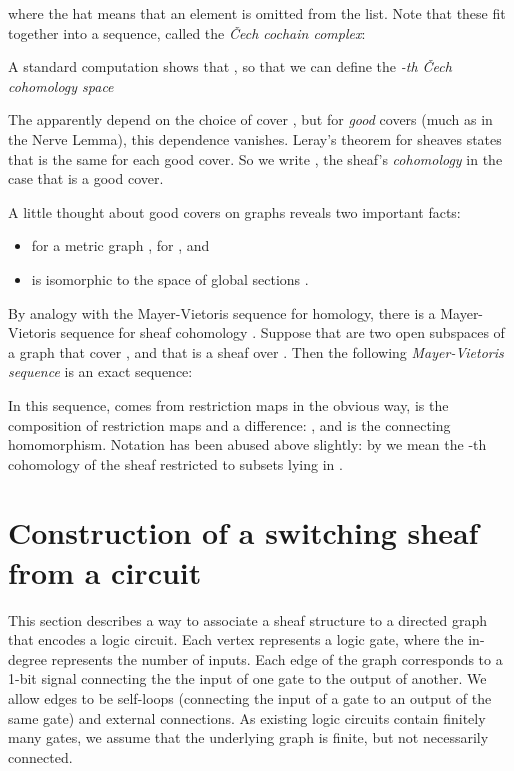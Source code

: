 \documentclass{amsart}
\theoremstyle{plain}
\theoremstyle{definition}
\begin{document}
where the hat means that an element is omitted from the list.
Note that these fit together into a sequence, called the {\it \v{C}ech
cochain complex}: 

A standard computation shows that , so that we can define
the {\it -th \v{C}ech cohomology space}


The  apparently depend on the choice of cover
, but for {\it good} covers (much as in the Nerve Lemma),
this dependence vanishes. Leray's theorem for sheaves states that
 is the same for each good
cover.  So we write
, the sheaf's
{\it cohomology} in the case that  is a good cover.

A little thought about good covers on graphs reveals two important facts:
\begin{itemize}
\item for a metric graph ,  for , and 
\item  is isomorphic to the space of global sections .  
\end{itemize}

By analogy with the Mayer-Vietoris sequence for homology, there is a
Mayer-Vietoris sequence for sheaf cohomology \cite{Bredon}.  Suppose
that  are two open subspaces of a graph  that cover , and
that  is a sheaf over .  Then the following {\it Mayer-Vietoris
  sequence} is an exact sequence:

In this sequence,  comes from restriction maps in the obvious way,
 is the composition of restriction maps and a difference: , and  is the
connecting homomorphism.  Notation has been abused above
slightly: by  we mean the -th cohomology of the sheaf 
restricted to subsets lying in .

\section{Construction of a switching sheaf from a circuit}
\label{def_sec}

This section describes a way to associate a sheaf structure to a directed graph that encodes a logic circuit.  Each vertex represents a logic gate, where the in-degree represents the number of inputs.  Each edge of the graph corresponds to a 1-bit signal connecting the the input of one gate to the output of another.  We allow edges to be self-loops (connecting the input of a gate to an output of the same gate) and external connections.  As existing logic circuits contain finitely many gates, we assume that the underlying graph is finite, but not necessarily connected.
\end{document}
